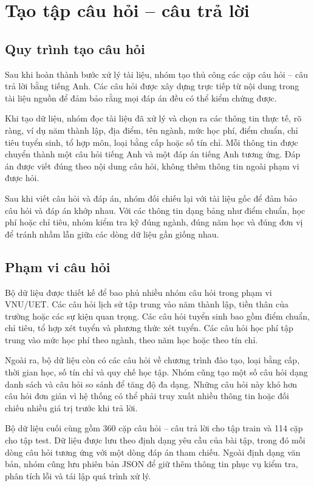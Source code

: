 \documentclass[12pt,a4paper]{report}
\begin{document}
\section{Tạo tập câu hỏi -- câu trả lời}

\subsection{Quy trình tạo câu hỏi}

Sau khi hoàn thành bước xử lý tài liệu, nhóm tạo thủ công các cặp câu hỏi -- câu trả lời bằng tiếng Anh. Các câu hỏi được xây dựng trực tiếp từ nội dung trong tài liệu nguồn để đảm bảo rằng mọi đáp án đều có thể kiểm chứng được.

Khi tạo dữ liệu, nhóm đọc tài liệu đã xử lý và chọn ra các thông tin thực tế, rõ ràng, ví dụ năm thành lập, địa điểm, tên ngành, mức học phí, điểm chuẩn, chỉ tiêu tuyển sinh, tổ hợp môn, loại bằng cấp hoặc số tín chỉ. Mỗi thông tin được chuyển thành một câu hỏi tiếng Anh và một đáp án tiếng Anh tương ứng. Đáp án được viết đúng theo nội dung câu hỏi, không thêm thông tin ngoài phạm vi được hỏi.

Sau khi viết câu hỏi và đáp án, nhóm đối chiếu lại với tài liệu gốc để đảm bảo câu hỏi và đáp án khớp nhau. Với các thông tin dạng bảng như điểm chuẩn, học phí hoặc chỉ tiêu, nhóm kiểm tra kỹ đúng ngành, đúng năm học và đúng đơn vị để tránh nhầm lẫn giữa các dòng dữ liệu gần giống nhau.

\subsection{Phạm vi câu hỏi}

Bộ dữ liệu được thiết kế để bao phủ nhiều nhóm câu hỏi trong phạm vi VNU/UET. Các câu hỏi lịch sử tập trung vào năm thành lập, tiền thân của trường hoặc các sự kiện quan trọng. Các câu hỏi tuyển sinh bao gồm điểm chuẩn, chỉ tiêu, tổ hợp xét tuyển và phương thức xét tuyển. Các câu hỏi học phí tập trung vào mức học phí theo ngành, theo năm học hoặc theo tín chỉ.

Ngoài ra, bộ dữ liệu còn có các câu hỏi về chương trình đào tạo, loại bằng cấp, thời gian học, số tín chỉ và quy chế học tập. Nhóm cũng tạo một số câu hỏi dạng danh sách và câu hỏi so sánh để tăng độ đa dạng. Những câu hỏi này khó hơn câu hỏi đơn giản vì hệ thống có thể phải truy xuất nhiều thông tin hoặc đối chiếu nhiều giá trị trước khi trả lời.

Bộ dữ liệu cuối cùng gồm 360 cặp câu hỏi -- câu trả lời cho tập train và 114 cặp cho tập test. Dữ liệu được lưu theo định dạng yêu cầu của bài tập, trong đó mỗi dòng câu hỏi tương ứng với một dòng đáp án tham chiếu. Ngoài định dạng văn bản, nhóm cũng lưu phiên bản JSON để giữ thêm thông tin phục vụ kiểm tra, phân tích lỗi và tái lập quá trình xử lý.
\end{document}
